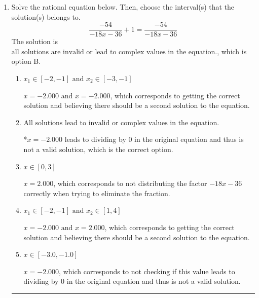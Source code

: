 \documentclass{extbook}[14pt]
\newcommand{\litem}[1]{\item #1

\rule{\textwidth}{0.4pt}}
\begin{document}
\begin{enumerate}\litem{
Solve the rational equation below. Then, choose the interval(s) that the solution(s) belongs to.
\[ \frac{-54}{-18x -36} + 1 = \frac{-54}{-18x -36} \]The solution is \( \text{all solutions are invalid or lead to complex values in the equation.} \), which is option B.\begin{enumerate}[label=\Alph*.]
\item \( x_1 \in [-2, -1] \text{ and } x_2 \in [-3,-1] \)

$x = -2.000 \text{ and } x = -2.000$, which corresponds to getting the correct solution and believing there should be a second solution to the equation.
\item \( \text{All solutions lead to invalid or complex values in the equation.} \)

*$x = -2.000$ leads to dividing by 0 in the original equation and thus is not a valid solution, which is the correct option.
\item \( x \in [0,3] \)

$x = 2.000$, which corresponds to not distributing the factor $-18x -36$ correctly when trying to eliminate the fraction.
\item \( x_1 \in [-2, -1] \text{ and } x_2 \in [1,4] \)

$x = -2.000 \text{ and } x = 2.000$, which corresponds to getting the correct solution and believing there should be a second solution to the equation.
\item \( x \in [-3.0,-1.0] \)

$x = -2.000$, which corresponds to not checking if this value leads to dividing by 0 in the original equation and thus is not a valid solution.
\end{enumerate}

}
\end{enumerate}
\end{document}
